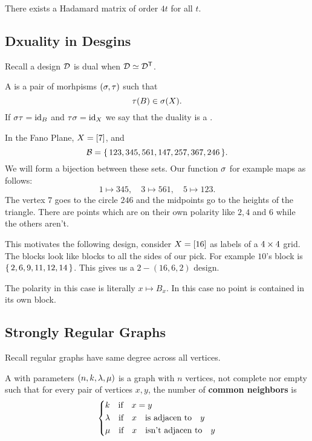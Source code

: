\documentclass[12pt]{memoir}
\begin{document}
\begin{Cor}
    There exists a Hadamard matrix of order $4t$ for all $t$.
\end{Cor}

\subsection{Dxuality in Desgins}

Recall a design $\mathcal{D}$ is dual when $\mathcal{D}\simeq\mathcal{D}^{\mathsf{T}}$. 

\begin{Def}
    A  is a pair of morhpisms $(\sigma,\tau)$ such that 
    $$\tau(B)\in \sigma(X).$$
    If $\sigma\tau=\operatorname{id}_B$ and $\tau\sigma=\operatorname{id}_X$ we say that the duality is a .
\end{Def}

\begin{Ex}
    In the Fano Plane, $X=\left\lbrack7\right\rbrack$, and 
    $$\mathcal{B}=\{\,123,345,561,147,257,367,246\,\}.$$
    We will form a bijection between these sets. Our function $\sigma$ for example maps as follows:
    $$1\mapsto 345,\quad 3\mapsto 561,\quad 5\mapsto 123.$$
    The vertex $7$ goes to the circle $246$ and the midpoints go to the heights of the triangle.
    There are points which are on their own polarity like $2,4$ and $6$ while the others aren't.
\end{Ex}

\begin{Ex}
    This motivates the following design, consider $X=\left\lbrack16\right\rbrack$ as labels of a $4\times4$ grid. The blocks look like blocks to all the sides of our pick. For example $10$'s block is $\{\,2,6,9,11,12,14\,\}$. This gives us a $2-(16,6,2)$ design.\par 
    The polarity in this case is literally $x\mapsto B_x$. In this case no point is contained in its own block.
\end{Ex}

\subsection{Strongly Regular Graphs}

Recall regular graphs have same degree across all vertices.

\begin{Def}
A  with parameters $(n,k,\lambda,\mu)$ is a graph with $n$ vertices, not complete nor empty such that for every pair of vertices $x,y$, the number of \textbf{common neighbors} is 
$$
\left\lbrace
\begin{aligned}
    &k\quad\text{if}\quad x=y\\
    &\lambda\quad\text{if}\quad x\quad\text{is adjacen
     to}\quad y\\
    &\mu\quad\text{if}\quad x\quad\text{isn't adjacen
     to}\quad y\\
\end{aligned}
\right.
$$    
\end{Def}
\end{document}
